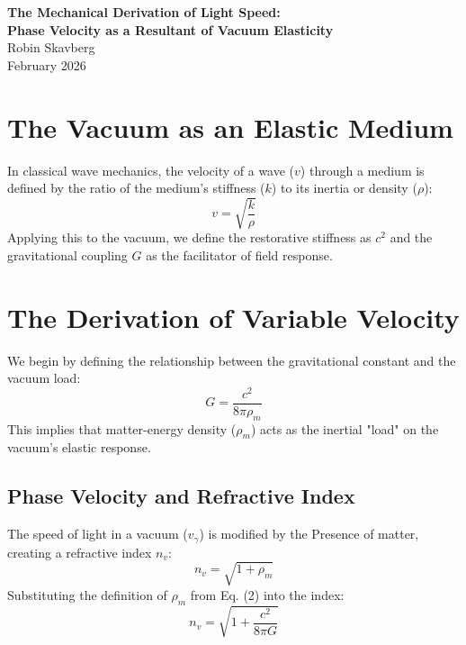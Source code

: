 \documentclass[12pt,a4paper]{article}
\begin{document}
\begin{center}
    \large \textbf{The Mechanical Derivation of Light Speed: \\ Phase Velocity as a Resultant of Vacuum Elasticity} \\
    \vspace{1em}
    \normalsize Robin Skavberg \\
    \normalsize February 2026
\end{center}

\begin{abstract}
This paper derives the speed of light (c) not as an axiomatic constant, but as a mechanical property of the vacuum medium. By defining the vacuum as an elastic manifold with an intrinsic restorative stiffness, we demonstrate that the propagation velocity of electromagnetic waves is governed by the local matter-energy load ($\rho_m$). This derivation provides a unified framework for understanding the 1.7s multi-messenger delay and suggests that the "universal speed limit" is a manifestation of the vacuum's ground-state impedance.
\end{abstract}

\section{The Vacuum as an Elastic Medium}
In classical wave mechanics, the velocity of a wave ($v$) through a medium is defined by the ratio of the medium's stiffness ($k$) to its inertia or density ($\rho$):
\begin{equation}
v = \sqrt{\frac{k}{\rho}}
\end{equation}
Applying this to the vacuum, we define the restorative stiffness as $c^2$ and the gravitational coupling $G$ as the facilitator of field response.

\section{The Derivation of Variable Velocity}
We begin by defining the relationship between the gravitational constant and the vacuum load:
\begin{equation}
G = \frac{c^2}{8\pi\rho_m}
\end{equation}
This implies that matter-energy density ($\rho_m$) acts as the inertial "load" on the vacuum's elastic response.

\subsection{Phase Velocity and Refractive Index}
The speed of light in a vacuum ($v_{\gamma}$) is modified by the Presence of matter, creating a refractive index $n_v$:
\begin{equation}
n_v = \sqrt{1 + \rho_m}
\end{equation}
Substituting the definition of $\rho_m$ from Eq. (2) into the index:
\begin{equation}
n_v = \sqrt{1 + \frac{c^2}{8\pi G}}
\end{equation}
\end{document}
